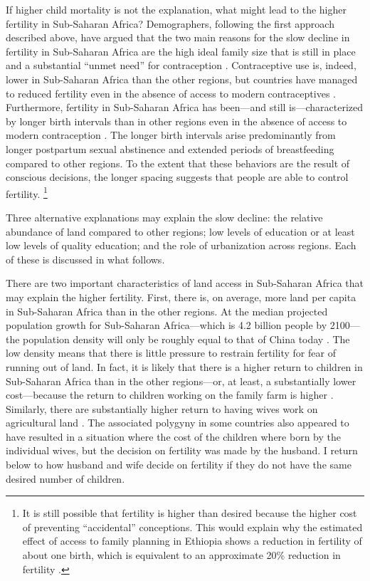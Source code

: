 \documentclass[letterpaper,12pt]{article}
\begin{document}
If higher child mortality is not the explanation, what might lead to the
higher fertility in Sub-Saharan Africa? 
Demographers, following the first approach described above, have argued 
that the two main reasons for the slow decline in fertility in Sub-Saharan 
Africa are the high ideal family size that is still in place and a 
substantial ``unmet need'' for contraception 
\citep{Bongaarts2013a,Casterline2017,Singh2017}.
Contraceptive use is, indeed, lower in Sub-Saharan Africa than the other
regions, but countries have managed to reduced fertility even in the
absence of access to modern contraceptives
\citet{Schultz1985,Galloway1987,Bailey1998,bengtsson06}.
Furthermore, fertility in Sub-Saharan Africa has been---and still 
is---characterized by longer birth intervals than in other regions even
in the absence of access to modern contraception 
\citep{Caldwell1992,Moultrie2012,Casterline2016}.
The longer birth intervals arise predominantly from longer postpartum 
sexual abstinence and extended periods of breastfeeding compared to 
other regions.
To the extent that these behaviors are the result of conscious decisions, 
the longer spacing suggests that people are able to control fertility.%
\footnote{
It is still possible that fertility is higher than desired because the
higher cost of preventing ``accidental'' conceptions.
This would explain why the estimated effect of access to family planning
in Ethiopia shows a reduction in fertility of about one birth, which is
equivalent to an approximate 20\% reduction in fertility
\citep{Portner2014a}.}

Three alternative explanations may explain the slow decline: the
relative abundance of land compared to other regions; low levels of
education or at least low levels of quality education; and the role of
urbanization across regions.
Each of these is discussed in what follows.

There are two important characteristics of land access in 
Sub-Saharan Africa that may explain the higher fertility.
First, there is, on average, more land per capita in Sub-Saharan Africa 
than in the other regions.
At the median projected population growth for Sub-Saharan Africa---which
is 4.2 billion people by 2100---the population density will only be
roughly equal to that of China today \citep[p 235]{Gerland2014}.
The low density means that there is little pressure to restrain
fertility for fear of running out of land.
In fact, it is likely that there is a higher return to children in
Sub-Saharan Africa than in the other regions---or, at least, a
substantially lower cost---because the return to children working on the
family farm is higher \citep{Caldwell1992,Bongaarts2013a}.
Similarly, there are substantially higher return to having wives work on
agricultural land \citep{jacoby95,Matz2016}.
The associated polygyny in some countries also appeared to have resulted 
in a situation where the cost of the children where born by the individual 
wives, but the decision on fertility was made by the husband.
I return below to how husband and wife decide on fertility if they do
not have the same desired number of children.
\end{document}
